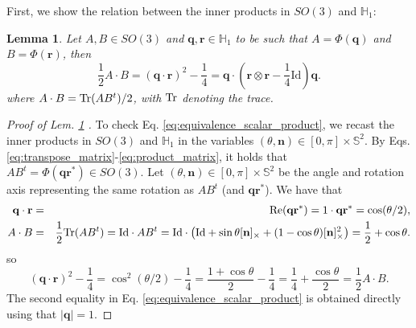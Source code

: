 \documentclass[12pt]{article}
\newtheorem{lemma}[theorem]{Lemma}
\newcommand{\beqar}{\begin{eqnarray*}}
\newcommand{\eeqar}{\end{eqnarray*}}
\newcommand{\lp}{\left(}
\newcommand{\rp}{\right)}
\newcommand{\be}{\begin{equation}}
\newcommand{\ee}{\end{equation}}
\newcommand{\nvec}{\mathbf{n}}
\newcommand{\Id}{\mathrm{Id}}
\newcommand{\tr}{\textnormal{Tr}}
\newcommand{\unitq}{{\mathbb{H}_1}}
\newcommand{\Real}{\mbox{Re}}
\newcommand{\q}{\mathbf{q}}
\begin{document}
\bigskip
First, we show the relation between the inner products in $SO(3)$ and $\unitq$:
\begin{lemma} \label{lem:equivalence_scalar_product}
Let $A,B\in SO(3)$ and $\q,\mathbf{r}\in \unitq$ to be such that
$A=\Phi(\q)$ and $B=\Phi(\mathbf{r})$, then
\be \label{eq:equivalence_scalar_product}
\frac{1}{2}A \cdot B= (\q \cdot \mathbf{r})^2 -\frac{1}{4} = \q \cdot \lp \mathbf{r}\otimes \mathbf{r}- \frac{1}{4}\Id \rp \q.
\ee
where $A \cdot B = \tr(AB^t)/2$, with $\tr$ denoting the trace.
\end{lemma} 
\begin{proof}[Proof of Lem. \ref{lem:equivalence_scalar_product} ]
To check Eq. \eqref{eq:equivalence_scalar_product}, we  recast the inner products in $SO(3)$ and $\unitq$  in the variables $(\theta,\nvec) \in [0,\pi]\times \mathbb{S}^2$. 
By Eqs. \eqref{eq:transpose_matrix}-\eqref{eq:product_matrix}, it holds  that $AB^t = \Phi(\q\mathbf{r}^*)\in SO(3)$. Let $(\theta,\nvec) \in [0,\pi]\times \mathbb{S}^2$ be the angle and rotation axis representing the same rotation as $AB^t$ (and $\q \mathbf{r}^*$). We have that
\beqar
\q \cdot \mathbf{r}& = &\Real(\q \mathbf{r}^*)=1\cdot \q\mathbf{r}^*= \cos(\theta/2),\\
A \cdot B & = &\frac{1}{2}\tr(AB^t)=\Id\cdot AB^t= \Id \cdot \lp \Id + \sin\theta[\nvec]_\times + (1-\cos\theta)[\nvec]_\times^2 \rp = \frac{1}{2}+ \cos\theta.
\eeqar
so
$$(\q\cdot \mathbf{r})^2 - \frac{1}{4}= \cos^2(\theta/2)-\frac{1}{4}= \frac{1+\cos\theta}{2}-\frac{1}{4}= \frac{1}{4}+\frac{\cos\theta}{2}= \frac{1}{2}A\cdot B.$$
The second equality in Eq. \eqref{eq:equivalence_scalar_product} is obtained directly using that $|\q|=1$.
\end{proof}
\end{document}
